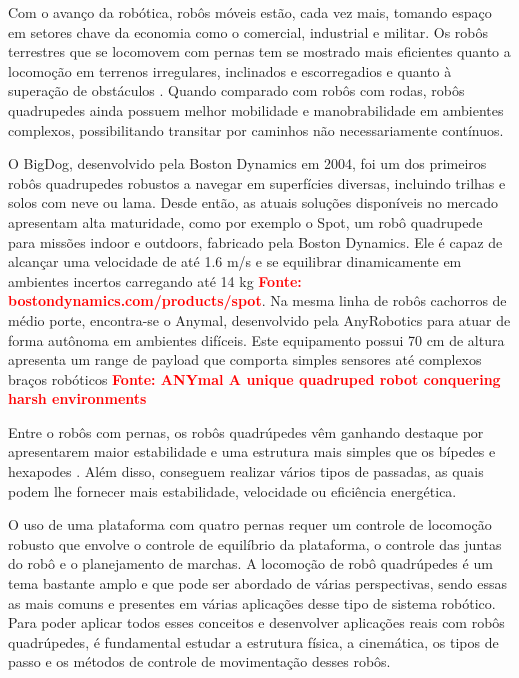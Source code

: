 \documentclass[../main.tex]{subfiles}
\begin{document}
  Com o avanço da robótica, robôs móveis estão, cada vez mais, tomando espaço em setores chave da economia como o comercial, industrial e militar. Os robôs terrestres que se locomovem com pernas tem se mostrado mais eficientes quanto a locomoção em terrenos irregulares, inclinados e escorregadios e quanto à superação de obstáculos \cite{X.134}. Quando comparado com robôs com rodas, robôs quadrupedes ainda possuem melhor mobilidade e manobrabilidade em ambientes complexos, possibilitando transitar por caminhos não necessariamente contínuos.
          
  O BigDog, desenvolvido pela Boston Dynamics em 2004, foi um dos primeiros robôs quadrupedes  robustos a navegar em superfícies diversas, incluindo trilhas e solos com neve ou lama. Desde então, as atuais soluções disponíveis no mercado apresentam alta maturidade, como por exemplo o Spot, um robô quadrupede para missões indoor e outdoors, fabricado pela Boston Dynamics. Ele é capaz de alcançar uma velocidade de até 1.6 m/s e se equilibrar dinamicamente em ambientes incertos carregando até 14 kg \textbf{\textcolor{red}{Fonte: bostondynamics.com/products/spot}}.  Na mesma linha de robôs cachorros de médio porte, encontra-se o Anymal, desenvolvido pela AnyRobotics para atuar de forma autônoma em ambientes difíceis. Este equipamento possui 70 cm de altura apresenta um range de payload que comporta simples sensores até complexos braços robóticos \textbf{\textcolor{red}{Fonte: ANYmal A unique quadruped robot conquering harsh environments}}

  Entre o robôs com pernas, os robôs quadrúpedes vêm ganhando destaque por apresentarem maior estabilidade e uma estrutura mais simples que os bípedes e hexapodes \cite{Shi2021}. Além disso, conseguem realizar vários tipos de passadas, as quais podem lhe fornecer mais estabilidade, velocidade ou eficiência energética. 

  O uso de uma plataforma com quatro pernas requer um controle de locomoção robusto que envolve o controle de equilíbrio da plataforma, o controle das juntas do robô e o planejamento de marchas. A locomoção de robô quadrúpedes é um tema bastante amplo e que pode ser abordado de várias perspectivas, sendo essas as mais comuns e presentes em várias aplicações desse tipo de sistema robótico. Para poder aplicar todos esses conceitos e desenvolver aplicações reais com robôs quadrúpedes, é fundamental estudar a estrutura física, a cinemática, os tipos de passo e os métodos de controle de movimentação desses robôs. 
\end{document}

